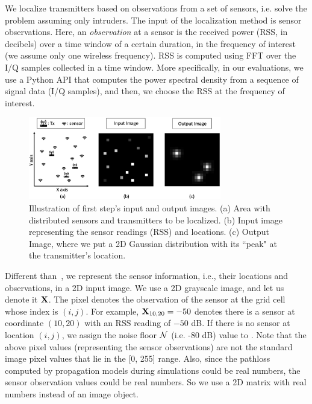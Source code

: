 We localize transmitters based on observations from a set of sensors, i.e. solve the \mtl problem assuming only intruders.
The input of the localization method is sensor observations. 
Here, an {\em observation} at a sensor is the received power (RSS, in decibels) over a time window of a certain duration, in the frequency of interest (we assume only one wireless frequency). 
RSS is computed using FFT over the I/Q samples collected in a time window. More specifically, in our evaluations, we use a Python API \cite{psd} that computes the power spectral density from a sequence of signal data (I/Q samples), and then, we choose the RSS at the frequency of interest.
\begin{figure}[t]
    \centering
    \includegraphics[width=0.75\textwidth]{chapters/wowmom-pmc/figures/input-output.png}
    \caption{Illustration of \our first step's input and output images. (a) Area with distributed sensors and transmitters to be localized. (b) Input image representing the sensor readings (RSS) and locations. (c) Output Image, where we put a 2D Gaussian distribution with its ``peak" at the transmitter's location.}
    \label{fig:input}
\end{figure}
Different than~\cite{mobicom17-splot,ipsn20-mtl}, we represent the sensor information, i.e.,
their locations and observations, in a 2D input image.
We use a 2D grayscale image, and let us denote it $\mathbf{X}$. The pixel \mxij denotes the observation of the sensor at the grid cell whose index is $(i, j)$. For example, $\mathbf{X}_{10, 20}=-50$ denotes there is a sensor at coordinate $(10, 20)$ with an RSS reading of $-50$ dB. 
If there is no sensor at location $(i, j)$, we assign the noise floor $\cal{N}$ (i.e. -80 dB) value to \mxij.
Note that the above pixel values (representing the sensor observations) are not the standard
image pixel values that lie in the [0, 255] range.
Also, since the pathloss computed by propagation models during simulations could be real numbers, the sensor observation values could be real numbers. 
So we use a 2D matrix with real numbers instead of an image object.

